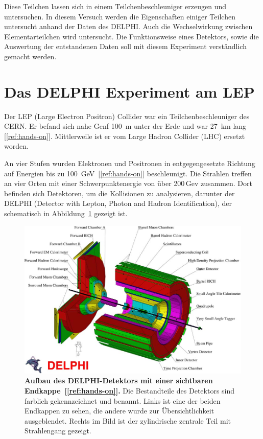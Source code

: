 \documentclass[a4paper,ngerman]{scrartcl}
\begin{document}
Diese Teilchen lassen sich in einem Teilchenbeschleuniger erzeugen und untersuchen.
In diesem Versuch werden die Eigenschaften einiger Teilchen untersucht anhand der Daten des DELPHI. 
Auch die Wechselwirkung zwischen Elementarteilchen wird untersucht.
Die Funktionsweise eines Detektors, sowie die Auswertung der entstandenen Daten soll mit diesem Experiment verständlich gemacht werden.



\section{Das DELPHI Experiment am LEP}
\label{sec:delphi}

Der LEP (Large Electron Positron) Collider war ein Teilchenbeschleuniger des CERN.
Er befand sich nahe Genf \SI{100}{\metre} unter der Erde und war \SI{27}{\kilo \metre} lang [\ref{ref:hands-on}]. 
Mittlerweile ist er vom Large Hadron Collider (LHC) ersetzt worden.

An vier Stufen wurden Elektronen und Positronen in entgegengesetzte Richtung auf Energien bis zu \SI{100}{GeV}~[\ref{ref:hands-on}] beschleunigt.
Die Strahlen treffen an vier Orten mit einer Schwerpunktenergie von über 200\,Gev zusammen.
Dort befinden sich Detektoren, um die Kollisionen zu analysieren, darunter der DELPHI (Detector with Lepton, Photon and Hadron Identification), der schematisch in Abbildung~\ref{fig:delphi_big} gezeigt ist.

\begin{figure}[tbh!]
\centering
\includegraphics[width=\textwidth]{abbildungen/delphi_big.png}
\caption{\textbf{Aufbau des DELPHI-Detektors mit einer sichtbaren Endkappe~[\ref{ref:hands-on}].} 
Die Bestandteile des Detektors sind farblich gekennzeichnet und benannt.
Links ist eine der beiden Endkappen zu sehen, die andere wurde zur Übersichtlichkeit ausgeblendet.
Rechts im Bild ist der zylindrische zentrale Teil mit Strahlengang gezeigt. 
}
\label{fig:delphi_big}
\end{figure}
\end{document}
